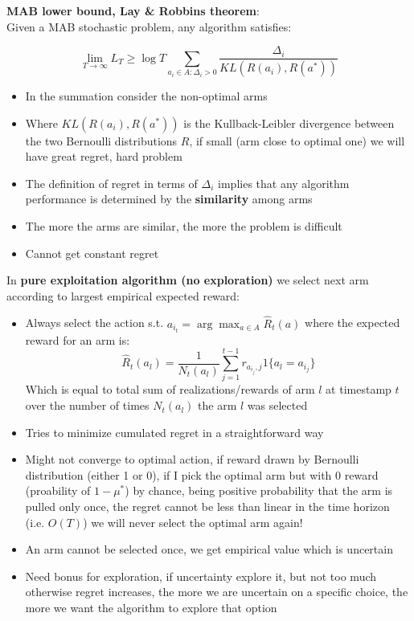     \textbf{MAB lower bound, Lay \& Robbins theorem}:\\
    Given a MAB stochastic problem, any algorithm satisfies:
    \begin{LARGE}
        $$\lim_{T\rightarrow \infty}L_T\geq \log T\sum_{a_i\in A:\Delta_i>0}\frac{\Delta_i}{KL(R(a_i),R(a^*))}$$
    \end{LARGE}
    \begin{itemize}
        \item In the summation consider the non-optimal arms
        \item Where $KL(R(a_i),R(a^*))$ is the Kullback-Leibler divergence between the two Bernoulli distributions $R$, if small (arm close to optimal one) we will have great regret, hard problem
        \item The definition of regret in terms of $\Delta_i$ implies that any algorithm performance is determined by the \textbf{similarity} among arms
        \item The more the arms are similar, the more the problem is difficult
        \item Cannot get constant regret
    \end{itemize}
    In \textbf{pure exploitation algorithm (no exploration)} we select next arm according to largest empirical expected reward:
    \begin{itemize}
        \item Always select the action s.t. $a_{i_t}=\arg\max_{a\in A}\hat{R}_t(a)$ where the expected reward for an arm is:
        $$\hat{R}_t(a_l)=\frac{1}{N_t(a_l)}\sum_{j=1}^{t-1}r_{a_{i_j},j}1\{a_l=a_{i_j}\}$$
        Which is equal to total sum of realizations/rewards of arm $l$ at timestamp $t$ over the number of times $N_t(a_l)$ the arm $l$ was selected
        \item Tries to minimize cumulated regret in a straightforward way
        \item Might not converge to optimal action, if reward drawn by Bernoulli distribution (either 1 or 0), if I pick the optimal arm but with 0 reward (proability of $1-\mu^*$) by chance, being positive probability that the arm is pulled only once, the regret cannot be less than linear in the time horizon (i.e. $O(T)$) we will never select the optimal arm again!
        \item An arm cannot be selected once, we get empirical value which is uncertain
        \item Need bonus for exploration, if uncertainty explore it, but not too much otherwise regret increases, the more we are uncertain on a specific choice, the more we want the algorithm to explore that option
    \end{itemize}

